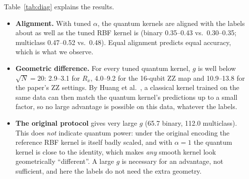 \begin{table}[H]
\centering\small
\caption{Kernel diagnostics on the training kernel (headline runs, mean over 5 seeds):
off-diagonal mean and standard deviation, centred alignment of the quantum and the tuned RBF
kernel, and the geometric difference $g(K_\text{RBF}\|K_Q)$ on 400 training flows.}
\label{tab:diag}
\end{table}

Table~\ref{tab:diag} explains the results.
\begin{itemize}
\item \textbf{Alignment.} With tuned $\alpha$, the quantum kernels are aligned with the labels about
      as well as the tuned RBF kernel is (binary 0.35--0.43 vs.\ 0.30--0.35; multiclass
      0.47--0.52 vs.\ 0.48). Equal alignment predicts equal accuracy, which is what we observe.
\item \textbf{Geometric difference.} For every tuned quantum kernel, $g$ is well below $\sqrt{N}=20$:
      2.9--3.1 for $R_x$, 4.0--9.2 for the 16-qubit ZZ map and 10.9--13.8 for the paper's ZZ
      settings. By Huang et al.~\cite{huang2021}, a classical kernel trained on the same data can then
      match the quantum kernel's predictions up to a small factor, so no large advantage is
      possible on this data, whatever the labels.
\item \textbf{The original protocol} gives very large $g$ (65.7 binary, 112.0 multiclass). This does
      \emph{not} indicate quantum power: under the original encoding the reference RBF kernel is
      itself badly scaled, and with $\alpha=1$ the quantum kernel is close to the identity, which
      makes \emph{any} smooth kernel look geometrically ``different''. A large $g$ is necessary for
      an advantage, not sufficient, and here the labels do not need the extra geometry.
\end{itemize}

